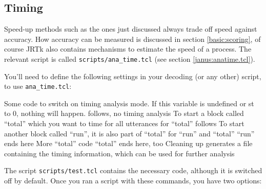 \subsection{Timing} \label{ibis:timing}

Speed-up methods  such as  the  ones just  discussed always  trade off
speed against  accuracy. How accuracy  can be measured is discussed in
section \ref{basic:scoring}, of  course JRTk also contains  mechanisms
to  estimate the  speed of  a process. The  relevant  script is called
\texttt{scripts/ana\_time.tcl} (see section \ref{janus:anatime.tcl}).

You'll need to define the following settings in your decoding (or any
other) script, to use \texttt{ana\_time.tcl}:

\begin{description}
 Some code
 to switch on timing analysis mode.
    If this variable is undefined or st to 0, nothing will happen.
 follows, no timing analysis
 To start a block called ``total'' which
    you want to time for all utterances
 for ``total'' follows
 To start another block called ``run'', 
    it is also part of ``total''
 for ``run'' and ``total''
 ``run'' ends here
 More ``total'' code
 ``total'' ends here, too
 Cleaning up
 generates a file containing the 
    timing information, which can be used for further analysis
\end{description}

The  script   \texttt{scripts/test.tcl} contains   the necessary code,
although  it is switched  off by default.  Once  you ran a script with
these commands, you have two options:


